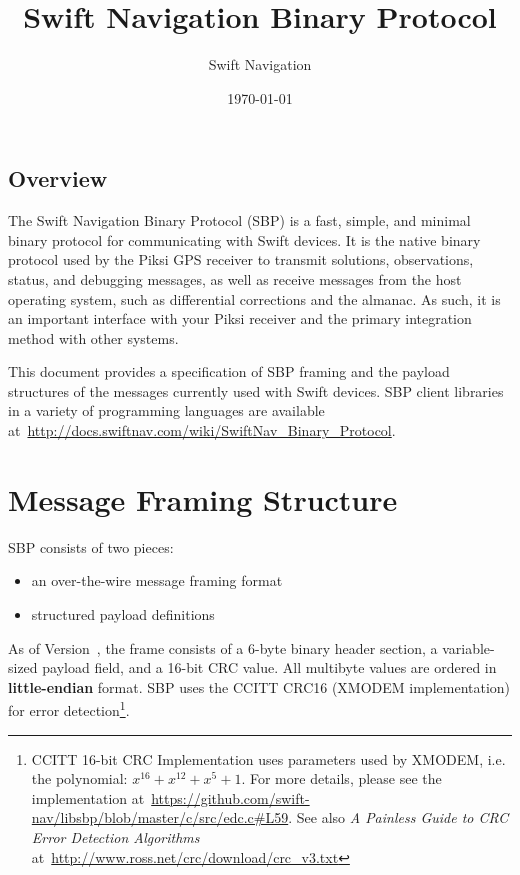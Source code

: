 \documentclass{article}
\title{Swift Navigation Binary Protocol}
\author{Swift Navigation}
\date{\today}
\makeatletter
\numberwithin{table}{subsection}
\numberwithin{field}{subsection}
\renewcommand\tableofcontents{\@starttoc{toc}}
\makeatother
\begin{document}
\maketitle
\begin{normalsize}
\setcounter{tocdepth}{2}
\begin{centering}
\tableofcontents
\end{centering}
\end{normalsize}

\thispagestyle{firstpage}
\bigskip
\bigskip
\begin{large}
\section{Overview}
\label{sec:Overview}
The Swift Navigation Binary Protocol (SBP) is a fast, simple, and
minimal binary protocol for communicating with Swift devices. It is
the native binary protocol used by the Piksi GPS receiver to transmit
solutions, observations, status, and debugging messages, as well as
receive messages from the host operating system, such as differential
corrections and the almanac. As such, it is an important interface
with your Piksi receiver and the primary integration method with other
systems.

This document provides a specification of SBP framing and the payload
structures of the messages currently used with Swift devices. SBP
client libraries in a variety of programming languages are available
at~\url{http://docs.swiftnav.com/wiki/SwiftNav_Binary_Protocol}.

\end{large}

\newpage
\section{Message Framing Structure}
\label{sec:Message}

\begin{large}
SBP consists of two pieces:
\begin{itemize}
  \item an over-the-wire message framing format
  \item structured payload definitions
\end{itemize}
As of Version~\theversion, the frame consists of a 6-byte binary
header section, a variable-sized payload field, and a 16-bit CRC
value. All multibyte values are ordered in \textbf{little-endian}
format. SBP uses the CCITT CRC16 (XMODEM implementation) for error
detection\footnote{CCITT 16-bit CRC Implementation uses parameters
  used by XMODEM, i.e. the polynomial: $x^{16} + x^{12} + x^5 +
  1$. For more details, please see the implementation
  at~\url{https://github.com/swift-nav/libsbp/blob/master/c/src/edc.c\#L59}. See
  also \emph{A Painless Guide to CRC Error Detection Algorithms}
  at~\url{http://www.ross.net/crc/download/crc_v3.txt}}.

\end{large}
\end{document}
